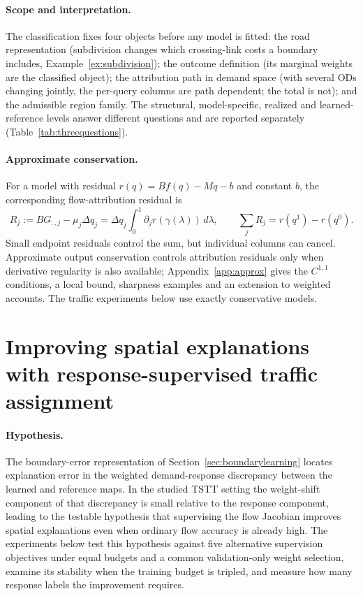 \documentclass[a4paper,fleqn]{cas-sc}
\begin{document}
\paragraph{Scope and interpretation.}\label{sec:noninheritance}
The classification fixes four objects before any model is fitted: the
road representation (subdivision changes which crossing-link costs a
boundary includes, Example~\ref{ex:subdivision}); the outcome
definition (its marginal weights are the classified object); the
attribution path in demand space (with several ODs changing jointly,
the per-query columns are path dependent; the total is not); and the
admissible region family. The structural, model-specific, realized and
learned-reference levels answer different questions and are reported
separately (Table~\ref{tab:threequestions}).

\paragraph{Approximate conservation.}
For a model with residual $r(q)=Bf(q)-Mq-b$ and constant $b$, the
corresponding flow-attribution residual is
\begin{equation}
R_j:=BG_{:,j}-\mu_j\Delta q_j
=\Delta q_j\int_0^1\partial_jr(\gamma(\lambda))\,d\lambda,
\qquad \sum_jR_j=r(q^1)-r(q^0).
\label{eq:residualidentity}
\end{equation}
Small endpoint residuals control the sum, but individual columns can cancel.
Approximate output conservation controls attribution residuals only when
derivative regularity is also available; Appendix~\ref{app:approx} gives
the $C^{1,1}$ conditions, a local bound, sharpness examples and an
extension to weighted accounts. The traffic experiments below use exactly
conservative models.






\FloatBarrier
\section{Improving spatial explanations with response-supervised traffic assignment}\label{sec:pairresults}
\paragraph{Hypothesis.}
The boundary-error representation of
Section~\ref{sec:boundarylearning} locates explanation error in the
weighted demand-response discrepancy between the learned and reference
maps. In the studied TSTT setting the weight-shift component of that
discrepancy is small relative to the response component, leading to the
testable hypothesis that supervising the flow Jacobian improves
spatial explanations even when ordinary flow accuracy is already high.
The experiments below test this hypothesis against five alternative
supervision objectives under equal budgets and a common validation-only
weight selection, examine its stability when the training budget is
tripled, and measure how many response labels the improvement requires.
\end{document}
